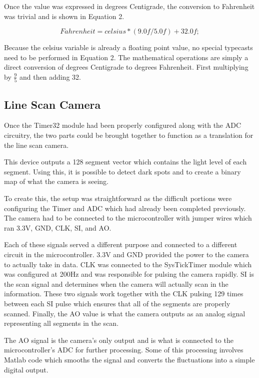 \documentclass[conference]{IEEEtran}
\begin{document}
Once the value was expressed in degrees Centigrade, the conversion to
Fahrenheit was trivial and is shown in Equation 2.

\begin{equation}
    Fahrenheit = celsius * (9.0f/5.0f) + 32.0f;
\end{equation}

Because the celsius variable is already a floating point value, no special
typecasts need to be performed in Equation 2. The mathematical operations are
simply a direct conversion of degrees Centigrade to degrees Fahrenheit. First
multiplying by $\frac{9}{5}$ and then adding 32.


\subsection{Line Scan Camera}
Once the Timer32 module had been properly configured along with the ADC
circuitry, the two parts could be brought together to function as a
translation for the line scan camera.

This device outputs a 128 segment vector which contains the light level of
each segment. Using this, it is possible to detect dark spots and to create a
binary map of what the camera is seeing.

To create this, the setup was straightforward as the difficult portions were
configuring the Timer and ADC which had already been completed previously. The
camera had to be connected to the microcontroller with jumper wires which ran
3.3V, GND, CLK, SI, and AO.

Each of these signals served a different purpose and connected to a different
circuit in the microcontroller. 3.3V and GND provided the power to the camera
to actually take in data. CLK was connected to the SysTickTimer module which
was configured at 200Hz and was responsible for pulsing the camera rapidly. SI
is the scan signal and determines when the camera will actually scan in the
information. These two signals work together with the CLK pulsing 129 times
between each SI pulse which ensures that all of the segments are properly
scanned. Finally, the AO value is what the camera outputs as an analog signal
representing all segments in the scan.

The AO signal is the camera's only output and is what is connected to the
microcontroller's ADC for further processing. Some of this processing involves
Matlab code which smooths the signal and converts the fluctuations into a
simple digital output.
\end{document}
